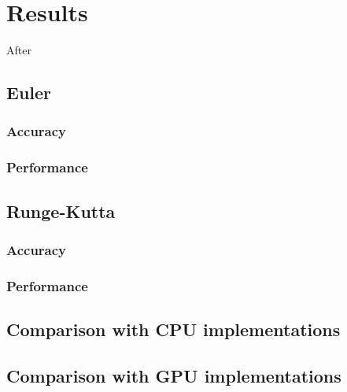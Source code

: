 \chapter{Results}
\label{s:results}
After 
\section{Euler}
\subsection{Accuracy}
\subsection{Performance}

\section{Runge-Kutta}
\subsection{Accuracy}
\subsection{Performance}

\section{Comparison with CPU implementations}
\section{Comparison with GPU implementations}





